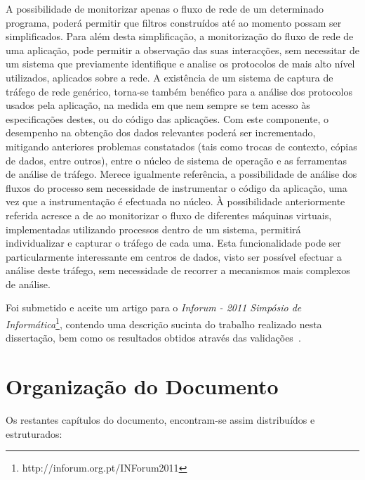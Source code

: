 A possibilidade de monitorizar apenas o fluxo de rede de um determinado programa, poderá permitir que filtros construídos até ao momento possam ser simplificados.
Para além desta simplificação, a monitorização do fluxo de rede de uma aplicação, pode permitir a observação das suas interacções, sem necessitar de um sistema que previamente identifique e analise os protocolos de mais alto nível utilizados, aplicados sobre a rede.
A existência de um sistema de captura de tráfego de rede genérico, torna-se também benéfico para a análise dos protocolos usados pela aplicação, na medida em que nem sempre se tem acesso às especificações destes, ou do código das aplicações.
Com este componente, o desempenho na obtenção dos dados relevantes poderá ser incrementado, mitigando anteriores problemas constatados (tais como trocas de contexto, cópias de dados, entre outros), entre o núcleo de sistema de operação e as ferramentas de análise de tráfego.
Merece igualmente referência, a possibilidade de análise dos fluxos do processo sem necessidade de instrumentar o código da aplicação, uma vez que a instrumentação é efectuada no núcleo.
À possibilidade anteriormente referida acresce a de ao monitorizar o fluxo de diferentes máquinas virtuais, implementadas utilizando processos dentro de um sistema, permitirá individualizar e capturar o tráfego de cada uma.
Esta funcionalidade pode ser particularmente interessante em centros de dados, visto ser possível efectuar a análise deste tráfego, sem necessidade de recorrer a mecanismos mais complexos de análise.

Foi submetido e aceite um artigo para o \textit{Inforum - 2011 Simpósio de Informática}\footnote{http://inforum.org.pt/INForum2011}, contendo uma descrição sucinta do trabalho realizado nesta dissertação, bem como os resultados obtidos através das validações~\cite{inforum}.

\bigskip 


\section{Organização do Documento}
\label{sec:intro_document_outline}

Os restantes capítulos do documento, encontram-se assim distribuídos e estruturados:

